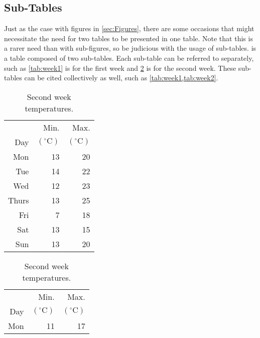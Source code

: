 \subsection{Sub-Tables}
    Just as the case with figures in \cref{sec:Figures}, there are some occasions that might necessitate the need for two tables to be presented in one table.
    Note that this is a rarer need than with sub-figures, so be judicious with the usage of sub-tables.
     is a table composed of two sub-tables.
    Each sub-table can be referred to separately, such as \cref{tab:week1} is for the first week and \cref{tab:week2} is for the second week.
    These sub-tables can be cited collectively as well, such as \cref{tab:week1,tab:week2}.
    \begin{table}
        \begin{subtable}[h]{0.375\textwidth}
            \centering
            \caption{First week temperatures.}
            \label{tab:week1}
            \begin{tabular}{r r r}
                      & Min.  & Max. \\
                Day   & $\left(^\circ\text{C}\right)$
                              & $\left(^\circ\text{C}\right)$ \\
                \hline
                Mon   & 13 & 20 \\
                Tue   & 14 & 22 \\
                Wed   & 12 & 23 \\
                Thurs & 13 & 25 \\
                Fri   & 7  & 18 \\
                Sat   & 13 & 15 \\
                Sun   & 13 & 20 \\
                \hline
            \end{tabular}
        \end{subtable}
        \hspace{0.2in}
        \begin{subtable}[h]{0.375\textwidth}
            \caption{Second week temperatures.}
            \label{tab:week2}
            \centering
            \begin{tabular}{r r r}
                      & Min.  & Max. \\
                Day   & $\left(^\circ\text{C}\right)$
                              & $\left(^\circ\text{C}\right)$ \\
                \hline
                Mon   & 11 & 17 \\

\end{tabular}
\end{subtable}
\end{table}
